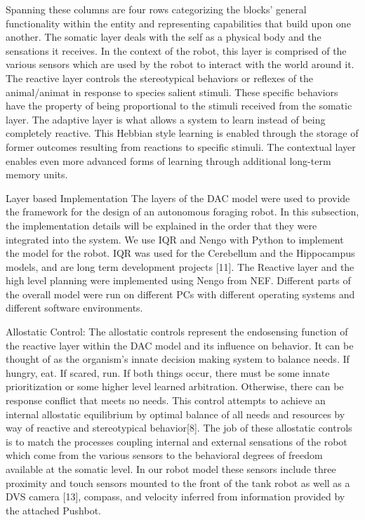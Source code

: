 Spanning these columns are four rows categorizing the blocks\textquoteright{}
general functionality within the entity and representing capabilities
that build upon one another. The somatic layer deals with the self
as a physical body and the sensations it receives. In the context
of the robot, this layer is comprised of the various sensors which
are used by the robot to interact with the world around it. The reactive
layer controls the stereotypical behaviors or reflexes of the animal/animat
in response to species salient stimuli. These specific behaviors have
the property of being proportional to the stimuli received from the
somatic layer. The adaptive layer is what allows a system to learn
instead of being completely reactive. This Hebbian style learning
is enabled through the storage of former outcomes resulting from reactions
to specific stimuli. The contextual layer enables even more advanced
forms of learning through additional long-term memory units.

Layer based Implementation The layers of the DAC model were used to
provide the framework for the design of an autonomous foraging robot.
In this subsection, the implementation details will be explained in
the order that they were integrated into the system. We use IQR and
Nengo with Python to implement the model for the robot. IQR was used
for the Cerebellum and the Hippocampus models, and are long term development
projects {[}11{]}. The Reactive layer and the high level planning
were implemented using Nengo from NEF. Different parts of the overall
model were run on different PCs with different operating systems and
different software environments.

Allostatic Control: The allostatic controls represent the endosensing
function of the reactive layer within the DAC model and its influence
on behavior. It can be thought of as the organism's innate decision
making system to balance needs. If hungry, eat. If scared, run. If
both things occur, there must be some innate prioritization or some
higher level learned arbitration. Otherwise, there can be response
conflict that meets no needs. This control attempts to achieve an
internal allostatic equilibrium by optimal balance of all needs and
resources by way of reactive and stereotypical behavior{[}8{]}. The
job of these allostatic controls is to match the processes coupling
internal and external sensations of the robot which come from the
various sensors to the behavioral degrees of freedom available at
the somatic level. In our robot model these sensors include three
proximity and touch sensors mounted to the front of the tank robot
as well as a DVS camera {[}13{]}, compass, and velocity inferred from
information provided by the attached Pushbot.

